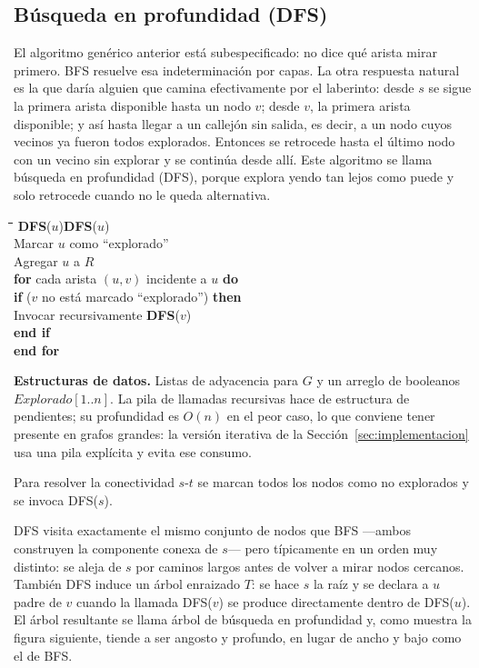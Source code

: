 \documentclass[12pt, spanish, oneside, openany]{book}
\newcommand{\pl}[1]{\makebox[1.6em][r]{\texttt{\footnotesize #1}}\hspace{0.9em}}
\newenvironment{pseudo}[1]{%
  \begin{center}%
  \begin{mdframed}[style=pseudobox]%
  \small
  \begin{tabbing}%
  \hspace{2.5em}\=\hspace{1.5em}\=\hspace{1.5em}\=\hspace{1.5em}\=\hspace{1.5em}\=\kill
  \def\pseudotitulo{#1}\ifx\pseudotitulo\empty\else#1\\[3pt]\fi}%
  {\end{tabbing}\end{mdframed}\end{center}}
\newenvironment{estructuras}%
  {\begin{center}\begin{minipage}{0.93\textwidth}\begin{mdframed}[style=estrbox]%
   \small\textbf{Estructuras de datos.}\;}%
  {\end{mdframed}\end{minipage}\end{center}}
\newcommand{\alg}[1]{#1}
\theoremstyle{uprightplain}
\theoremstyle{definition}
\theoremstyle{remark}
\theoremstyle{definition}
\begin{document}
\subsection{Búsqueda en profundidad (DFS)}

El algoritmo genérico anterior está subespecificado: no dice qué arista mirar primero. BFS resuelve esa indeterminación por capas. La otra respuesta natural es la que daría alguien que camina efectivamente por el laberinto: desde $s$ se sigue la primera arista disponible hasta un nodo $v$; desde $v$, la primera arista disponible; y así hasta llegar a un callejón sin salida, es decir, a un nodo cuyos vecinos ya fueron todos explorados. Entonces se retrocede hasta el último nodo con un vecino sin explorar y se continúa desde allí. Este algoritmo se llama búsqueda en profundidad (DFS), porque explora yendo tan lejos como puede y solo retrocede cuando no le queda alternativa.

\begin{pseudo}{\textbf{DFS}($u$)}
\pl{1}\> Marcar $u$ como ``explorado''\\
\pl{2}\> Agregar $u$ a $R$\\
\pl{3}\> \textbf{for} cada arista $(u,v)$ incidente a $u$ \textbf{do}\\
\pl{4}\>\> \textbf{if} ($v$ no está marcado ``explorado'') \textbf{then}\\
\pl{5}\>\>\> Invocar recursivamente \textbf{DFS}($v$)\\
\pl{6}\>\> \textbf{end if}\\
\pl{7}\> \textbf{end for}
\end{pseudo}

\begin{estructuras}
Listas de adyacencia para $G$ y un arreglo de booleanos
$\mathit{Explorado}[1..n]$. La pila de llamadas recursivas hace de estructura de
pendientes; su profundidad es $O(n)$ en el peor caso, lo que conviene tener
presente en grafos grandes: la versión iterativa de la
Sección~\ref{sec:implementacion} usa una pila explícita y evita ese consumo.
\end{estructuras}


Para resolver la conectividad $s$-$t$ se marcan todos los nodos como no explorados y se invoca \alg{DFS}($s$).

DFS visita exactamente el mismo conjunto de nodos que BFS ---ambos construyen la componente conexa de $s$--- pero típicamente en un orden muy distinto: se aleja de $s$ por caminos largos antes de volver a mirar nodos cercanos. También DFS induce un árbol enraizado $T$: se hace $s$ la raíz y se declara a $u$ padre de $v$ cuando la llamada \alg{DFS}($v$) se produce directamente dentro de \alg{DFS}($u$). El árbol resultante se llama árbol de búsqueda en profundidad y, como muestra la figura siguiente, tiende a ser angosto y profundo, en lugar de ancho y bajo como el de BFS.
\end{document}
